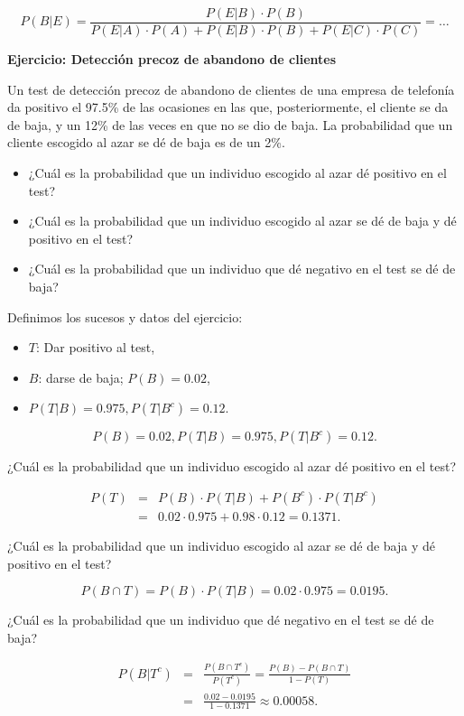 \documentclass[
  letterpaper,
  DIV=11,
  numbers=noendperiod]{scrreprt}
\providecommand{\tightlist}{%
  \setlength{\itemsep}{0pt}\setlength{\parskip}{0pt}}\usepackage{longtable,booktabs,array}
\begin{document}
\[P(B|E)\!=\!\dfrac{P(E|B)\cdot P(B)}{P(E|A)\!\cdot\! P(A)\!+\!P(E|B)\!\cdot\! P(B)\!+\!P(E|C)\!\cdot\! P(C)}\!=\!\ldots\]

\textbf{Ejercicio: Detección precoz de abandono de clientes}

Un test de detección precoz de abandono de clientes de una empresa de
telefonía da positivo el 97.5\% de las ocasiones en las que,
posteriormente, el cliente se da de baja, y un 12\% de las veces en que
no se dio de baja. La probabilidad que un cliente escogido al azar se dé
de baja es de un 2\%.

\begin{itemize}
\tightlist
\item
  ¿Cuál es la probabilidad que un individuo escogido al azar dé positivo
  en el test?
\item
  ¿Cuál es la probabilidad que un individuo escogido al azar se dé de
  baja y dé positivo en el test?
\item
  ¿Cuál es la probabilidad que un individuo que dé negativo en el test
  se dé de baja?
\end{itemize}

Definimos los sucesos y datos del ejercicio:

\begin{itemize}
\tightlist
\item
  \(T\): Dar positivo al test,
\item
  \(B\): darse de baja; \(P(B)=0.02\),
\item
  \(P(T|B)=0.975, P(T|B^c)=0.12\).
\end{itemize}

\[P(B)=0.02, P(T|B)=0.975, P(T|B^c)=0.12.\]

¿Cuál es la probabilidad que un individuo escogido al azar dé positivo
en el test?

\begin{eqnarray*}
P(T) &= & P(B)\cdot P(T|B)+P(B^c)\cdot P(T|B^c)\\
& = &0.02\cdot 0.975+0.98\cdot 0.12=0.1371.
\end{eqnarray*}

¿Cuál es la probabilidad que un individuo escogido al azar se dé de baja
y dé positivo en el test?

\[P(B\cap T)= P(B)\cdot P(T|B)=0.02\cdot 0.975=0.0195.\]

¿Cuál es la probabilidad que un individuo que dé negativo en el test se
dé de baja?

\begin{eqnarray*}
P(B|T^c) & = &\displaystyle \frac{P(B\cap T^c)}{P(T^c)}=
\frac{P(B)-P(B\cap T)}{1-P(T)}\\
& = & \displaystyle
\frac{0.02-0.0195}{1-0.1371}\approx 0.00058.
\end{eqnarray*}
\end{document}
